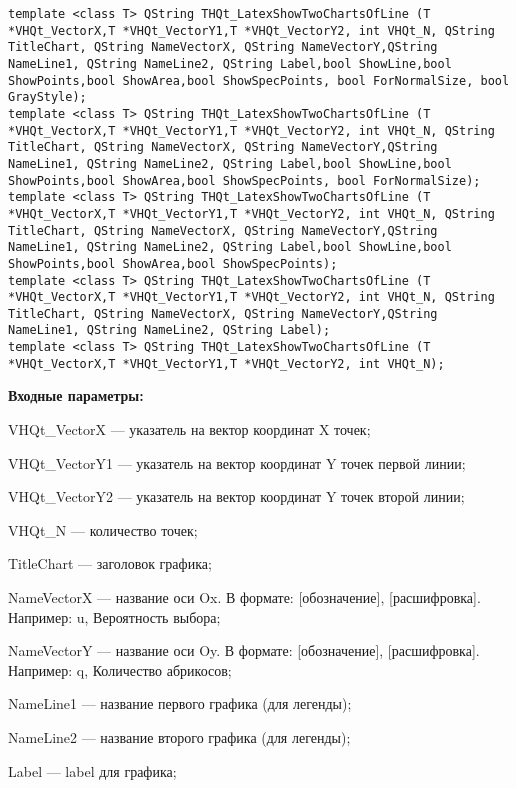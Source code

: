 \documentclass[a4paper,12pt]{article}
\begin{document}
\begin{lstlisting}[label=code_syntax_THQt_LatexShowTwoChartsOfLine,caption=Синтаксис]
template <class T> QString THQt_LatexShowTwoChartsOfLine (T *VHQt_VectorX,T *VHQt_VectorY1,T *VHQt_VectorY2, int VHQt_N, QString TitleChart, QString NameVectorX, QString NameVectorY,QString NameLine1, QString NameLine2, QString Label,bool ShowLine,bool ShowPoints,bool ShowArea,bool ShowSpecPoints, bool ForNormalSize, bool GrayStyle);
template <class T> QString THQt_LatexShowTwoChartsOfLine (T *VHQt_VectorX,T *VHQt_VectorY1,T *VHQt_VectorY2, int VHQt_N, QString TitleChart, QString NameVectorX, QString NameVectorY,QString NameLine1, QString NameLine2, QString Label,bool ShowLine,bool ShowPoints,bool ShowArea,bool ShowSpecPoints, bool ForNormalSize);
template <class T> QString THQt_LatexShowTwoChartsOfLine (T *VHQt_VectorX,T *VHQt_VectorY1,T *VHQt_VectorY2, int VHQt_N, QString TitleChart, QString NameVectorX, QString NameVectorY,QString NameLine1, QString NameLine2, QString Label,bool ShowLine,bool ShowPoints,bool ShowArea,bool ShowSpecPoints);
template <class T> QString THQt_LatexShowTwoChartsOfLine (T *VHQt_VectorX,T *VHQt_VectorY1,T *VHQt_VectorY2, int VHQt_N, QString TitleChart, QString NameVectorX, QString NameVectorY,QString NameLine1, QString NameLine2, QString Label);
template <class T> QString THQt_LatexShowTwoChartsOfLine (T *VHQt_VectorX,T *VHQt_VectorY1,T *VHQt_VectorY2, int VHQt_N);
\end{lstlisting}

\textbf{Входные параметры:}
 
VHQt\_VectorX --- указатель на вектор координат X точек;
 
VHQt\_VectorY1 --- указатель на вектор координат Y точек первой линии;
 
VHQt\_VectorY2 --- указатель на вектор координат Y точек второй линии;
 
VHQt\_N --- количество точек;
 
TitleChart --- заголовок графика;
 
NameVectorX --- название оси Ox. В формате: [обозначение], [расшифровка]. Например: u, Вероятность выбора;
 
NameVectorY --- название оси Oy. В формате: [обозначение], [расшифровка]. Например: q, Количество абрикосов;
 
NameLine1 --- название первого графика (для легенды);
 
NameLine2 --- название второго графика (для легенды);
 
Label --- label для графика;
 
\end{document}
